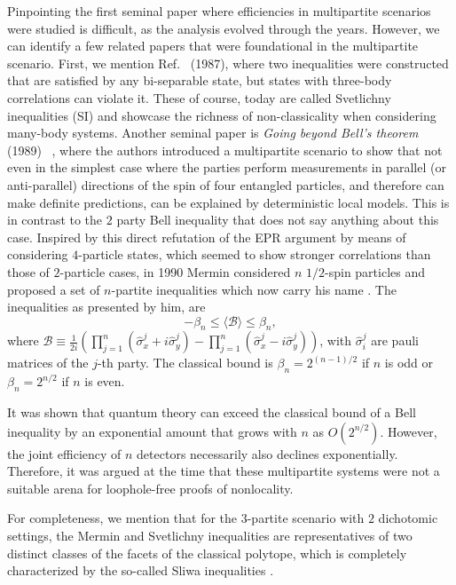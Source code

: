 \documentclass[aps,pra,reprint, superscriptaddress,showkeys]{revtex4-2}
\theoremstyle{plain}
\begin{document}
Pinpointing the first seminal paper where efficiencies in multipartite scenarios were studied is difficult, as the analysis evolved through the years. However, we can identify a few related papers that were foundational in the multipartite scenario. First, we mention Ref.~\cite{Svetlichny_ineqs} (1987), where two inequalities were constructed that are satisfied by any bi-separable state, but states with three-body correlations can violate it. These of course, today are called  Svetlichny inequalities (SI) and showcase the richness of non-classicality when considering many-body systems. Another seminal paper is  \textit{Going beyond Bell's theorem} (1989)~\cite{GHZ_Beyond_Bell} , where the authors introduced a multipartite scenario to show that not even in the simplest case where the parties perform measurements in parallel (or anti-parallel) directions of the spin of four entangled particles, and therefore can make definite predictions, can be explained by deterministic local models. This is in contrast to the $2$ party Bell inequality that does not say anything about this case. Inspired by this direct refutation of the EPR argument by means of considering $4$-particle states, which seemed to show stronger correlations than those of  $2$-particle cases, in 1990 Mermin considered $n$ $1/2$-spin particles and proposed a set of $n$-partite inequalities which now carry his name \cite{Mermin_ineqs}. The inequalities as presented by him,  are
\begin{equation}
    -\beta_n \leq \langle\mathcal{B}\rangle\leq \beta_n,
\end{equation}
where $\mathcal{B} \equiv \frac{1}{2i} \left( \prod_{j=1}^{n} \left( \hat{\sigma}_{x}^{j} + i\hat{\sigma}_{y}^{j} \right) - \prod_{j=1}^{n} \left( \hat{\sigma}_{x}^{j} - i\hat{\sigma}_{y}^{j} \right) \right)$, with $\hat \sigma^j_i$ are pauli matrices of the $j$-th party. The classical bound is $\beta_n = 2^{(n-1)/2}$ if $n$ is odd or $\beta_n = 2^{n/2}$ if $n$ is even. 


It was shown that quantum theory can exceed the classical bound of a Bell inequality by an exponential amount that grows with $n$ as $O(2^{n/2})$. However, the joint efficiency of $n$ detectors necessarily also declines exponentially. Therefore, it was argued at the time that these multipartite systems were not a suitable arena for loophole-free proofs of nonlocality.  

For completeness, we mention that for the $3$-partite scenario with $2$ dichotomic settings, the Mermin and Svetlichny inequalities are representatives of two distinct classes of the facets of the classical polytope, which is completely characterized by the so-called Sliwa inequalities \cite{SLIWA2003165}. 
\end{document}
